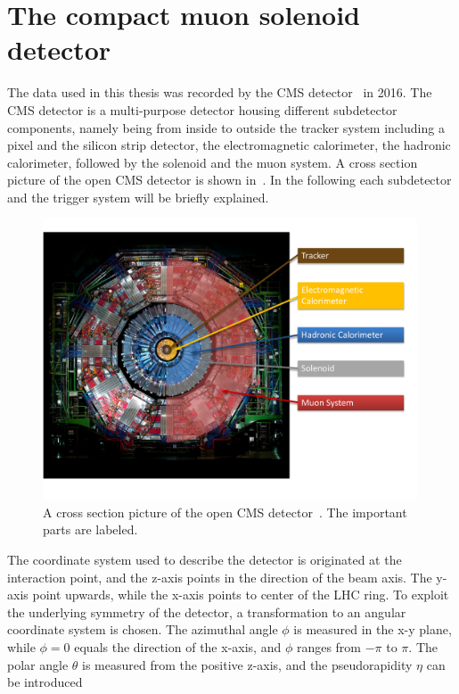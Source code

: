 \section{The compact muon solenoid detector}\label{sec:CMS}
The data used in this thesis was recorded by the CMS detector~\cite{CMS,CMSTDR} in 2016. The CMS detector is a multi-purpose detector housing different subdetector components, namely being from inside to outside the tracker system including a pixel and the silicon strip detector, the electromagnetic calorimeter, the hadronic calorimeter, followed by the solenoid and the muon system. A cross section picture of the open CMS detector is shown in~. In the following each subdetector and the trigger system will be briefly explained.\\
\begin{figure}[hbtp]
 \centering
 \includegraphics[width=0.99\textwidth]{figures/general/CMS}
 \caption{A cross section picture of the open CMS detector~\cite{CMSPicture}. The important parts are labeled.}
 \label{fig:CMS}
\end{figure}
The coordinate system used to describe the detector is originated at the interaction point, and the z-axis points in the direction of the beam axis. The y-axis point upwards, while the x-axis points to center of the LHC ring. To exploit the underlying symmetry of the detector, a transformation to an angular coordinate system is chosen. The azimuthal angle $\phi$ is measured in the x-y plane, while $\phi=0$ equals the direction of the x-axis, and $\phi$ ranges from $-\pi$ to $\pi$. The polar angle $\theta$ is measured from the positive z-axis, and the pseudorapidity $\eta$ can be introduced
